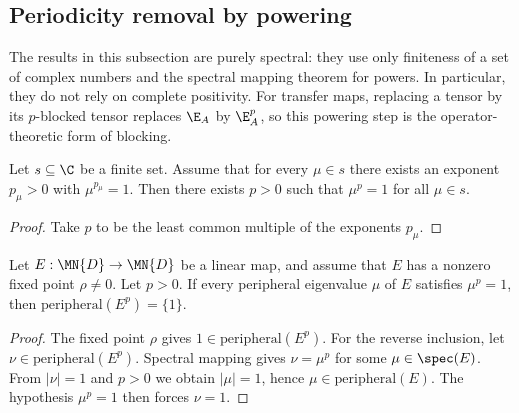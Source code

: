 \subsection{Periodicity removal by powering}\label{subsec:periodicity_removal_power}

\begin{remark}\label{rem:periodicity_removal_spectral}\leanok
    The results in this subsection are purely spectral: they use only
    finiteness of a set of complex numbers and the spectral mapping theorem
    for powers. In particular, they do not rely on complete positivity.
    For transfer maps, replacing a tensor by its $p$-blocked tensor replaces
    $\E_A$ by $\E_A^p$, so this powering step is the operator-theoretic
    form of blocking.
\end{remark}

\begin{lemma}\label{lem:common_power_eq_one}
    \leanok
    Let $s\subseteq\C$ be a finite set.
    Assume that for every $\mu\in s$ there exists an exponent $p_\mu>0$
    with $\mu^{p_\mu}=1$.
    Then there exists $p>0$ such that $\mu^p=1$ for all $\mu\in s$.
\end{lemma}

\begin{proof}\leanok
    Take $p$ to be the least common multiple of the exponents $p_\mu$.
\end{proof}

\begin{lemma}\label{lem:peripheral_pow_singleton}
    \leanok
    Let $E:\MN{D}\to\MN{D}$ be a linear map, and assume that $E$ has a
    nonzero fixed point $\rho\neq0$. Let $p>0$.
    If every peripheral eigenvalue $\mu$ of $E$ satisfies $\mu^p=1$,
    then $\mathrm{peripheral}(E^p)=\{1\}$.
\end{lemma}

\begin{proof}\leanok
    The fixed point $\rho$ gives $1\in\mathrm{peripheral}(E^p)$.
    For the reverse inclusion, let $\nu\in\mathrm{peripheral}(E^p)$.
    Spectral mapping gives $\nu=\mu^p$ for some $\mu\in\spec(E)$.
    From $|\nu|=1$ and $p>0$ we obtain $|\mu|=1$, hence
    $\mu\in\mathrm{peripheral}(E)$.
    The hypothesis $\mu^p=1$ then forces $\nu=1$.
\end{proof}

